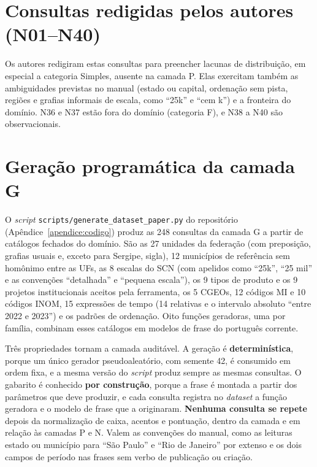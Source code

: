 

\section{Consultas redigidas pelos autores (N01--N40)}
\label{apx:dataset-n}

Os autores redigiram estas consultas para preencher lacunas de distribuição, em especial a categoria Simples, ausente na camada P. Elas exercitam também as ambiguidades previstas no manual (estado ou capital, ordenação sem pista, regiões e grafias informais de escala, como ``25k'' e ``cem k'') e a fronteira do domínio. N36 e N37 estão fora do domínio (categoria F), e N38 a N40 são observacionais.



\section{Geração programática da camada G}
\label{sec:dataset-gerado}

O \textit{script} \texttt{scripts/\allowbreak generate\_dataset\_paper.py} do repositório (Apêndice~\ref{apendice:codigo}) produz as 248 consultas da camada G a partir de catálogos fechados do domínio. São as 27 unidades da federação (com preposição, grafias usuais e, exceto para Sergipe, sigla), 12 municípios de referência sem homônimo entre as UFs, as 8 escalas do SCN (com apelidos como ``25k'', ``25 mil'' e as convenções ``detalhada'' e ``pequena escala''), os 9 tipos de produto e os 9 projetos institucionais aceitos pela ferramenta, os 5 CGEOs, 12 códigos MI e 10 códigos INOM, 15 expressões de tempo (14 relativas e o intervalo absoluto ``entre 2022 e 2023'') e os padrões de ordenação. Oito funções geradoras, uma por família, combinam esses catálogos em modelos de frase do português corrente.

Três propriedades tornam a camada auditável. A geração é \textbf{determinística}, porque um único gerador pseudoaleatório, com semente 42, é consumido em ordem fixa, e a mesma versão do \textit{script} produz sempre as mesmas consultas. O gabarito é conhecido \textbf{por construção}, porque a frase é montada a partir dos parâmetros que deve produzir, e cada consulta registra no \textit{dataset} a função geradora e o modelo de frase que a originaram. \textbf{Nenhuma consulta se repete} depois da normalização de caixa, acentos e pontuação, dentro da camada e em relação às camadas P e N. Valem as convenções do manual, como as leituras estado ou município para ``São Paulo'' e ``Rio de Janeiro'' por extenso e os dois campos de período nas frases sem verbo de publicação ou criação.

